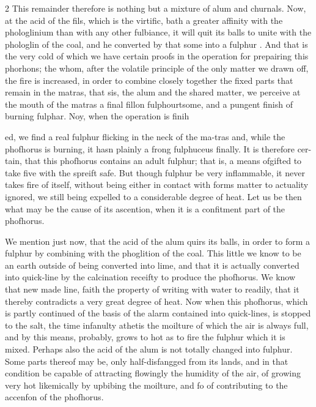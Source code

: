 \documentclass[10pt]{article}
\begin{document}
\begin{multicols}{2}
This remainder therefore is nothing but a mixture of alum and churnals. Now, at the acid of the fils, which is the virtific, bath a greater affinity with the phologlinium than with any other fulbiance, it will quit its balls to unite with the phologlin of the coal, and he converted by that some into a fulphur . And that is the very cold of which we have certain proofs in the operation for prepairing this phorhons; the whom, after the volatile principle of the only matter we drawn off, the fire is increased, in order to combine closely together the fixed parts that remain in the matras, that sis, the alum and the shared matter, we perceive at the mouth of the matras a final fillon fulphourtsome, and a pungent finish of burning fulphar. Noy, when the operation is finih

ed, we find a real fulphur flicking in the neck of the ma-tras and, while the phofhorus is burning, it hasn plainly a frong fulphuceus finally. It is therefore cer-tain, that this phofhorus contains an adult fulphur; that is, a means ofgifted to take five with the spreift safe. But though fulphur be very inflammable, it never takes fire of itself, without being either in contact with forms matter to actuality ignored, we still being expelled to a considerable degree of heat. Let us be then what may be the cause of its ascention, when it is a confitment part of the phofhorus.

We mention just now, that the acid of the alum quirs its balls, in order to form a fulphur by combining with the phoglition of the coal. This little we know to be an earth outside of being converted into lime, and that it is actually converted into quick-line by the calcination receifty to produce the phofhorus. We know that new made line, faith the property of writing with water to readily, that it thereby contradicts a very great degree of heat. Now when this phofhorus, which is partly continued of the basis of the alarm contained into quick-lines, is stopped to the salt, the time infanulty athetis the moilture of which the air is always full, and by this means, probably, grows to hot as to fire the fulphur which it is mixed. Perhaps also the acid of the alum is not totally changed into fulphur. Some parts thereof may be, only half-disfangged from its lands, and in that condition be capable of attracting flowingly the humidity of the air, of growing very hot likemically by upbibing the moilture, and fo of contributing to the accenfon of the phofhorus.


\end{multicols}
\end{document}
